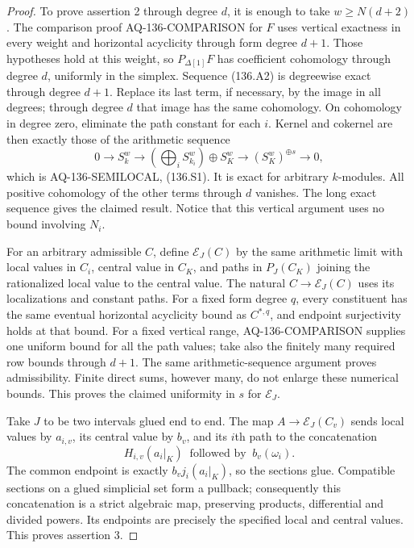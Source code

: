 \begin{proof}
To prove assertion 2 through degree $d$, it is enough to take
$w\geq N(d+2)$.  The comparison proof AQ-136-COMPARISON for $F$
uses vertical exactness in every weight and horizontal acyclicity
through form degree $d+1$.  Those hypotheses hold at this weight,
so $P_{\Delta[1]}F$ has coefficient cohomology through degree $d$,
uniformly in the simplex.  Sequence (136.A2) is degreewise exact
through degree $d+1$.  Replace its last term, if necessary, by the
image in all degrees; through degree $d$ that image has the same
cohomology.  On cohomology in degree zero, eliminate the path
constant for each $i$.  Kernel and cokernel are then exactly those
of the arithmetic sequence
\[
 0\to S_k^w\to
       \left(\bigoplus_iS_{k_i}^w\right)\oplus S_K^w
       \to(S_K^w)^{\oplus s}\to0,
\]
which is AQ-136-SEMILOCAL, (136.S1).  It is exact for arbitrary
$k$-modules.  All positive cohomology of the other terms through
$d$ vanishes.  The long exact sequence gives the claimed result.
Notice that this vertical argument uses no bound involving $N_i$.

For an arbitrary admissible $C$, define $\mathcal E_J(C)$ by the
same arithmetic limit with local values in $C_i$, central value
in $C_K$, and paths in $P_J(C_K)$ joining the rationalized local
value to the central value.  The natural $C\to\mathcal E_J(C)$
uses its localizations and constant paths.  For a fixed form degree
$q$, every constituent has the same eventual horizontal acyclicity
bound as $C^{*,q}$, and endpoint surjectivity holds at that bound.
For a fixed vertical range, AQ-136-COMPARISON supplies one uniform
bound for all the path values; take also the finitely many required
row bounds through $d+1$.  The same arithmetic-sequence argument
proves admissibility.  Finite direct sums, however many, do not
enlarge these numerical bounds.  This proves the claimed uniformity
in $s$ for $\mathcal E_J$.

Take $J$ to be two intervals glued end to end.  The map
$A\to\mathcal E_J(C_v)$ sends local values by $a_{i,v}$, its
central value by $b_v$, and its $i$th path to the concatenation
\[
                   H_{i,v}(a_i|_K)\ \text{ followed by }\ b_v(\omega_i).
\]
The common endpoint is exactly $b_vj_i(a_i|_K)$, so the sections
glue.  Compatible sections on a glued simplicial set form a
pullback; consequently this concatenation is a strict algebraic
map, preserving products, differential and divided powers.  Its
endpoints are precisely the specified local and central values.
This proves assertion 3.


\end{proof}
